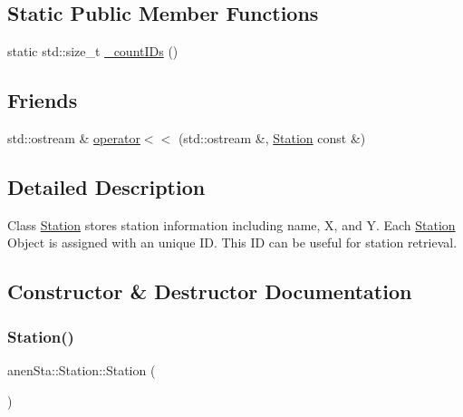 \subsection*{Static Public Member Functions}
\begin{DoxyCompactItemize}
\item 
static std\+::size\+\_\+t \mbox{\hyperlink{classanen_sta_1_1_station_a6623cdce8748308c6d0e27ab4a111eb7}{\+\_\+count\+I\+Ds}} ()
\end{DoxyCompactItemize}
\subsection*{Friends}
\begin{DoxyCompactItemize}
\item 
std\+::ostream \& \mbox{\hyperlink{classanen_sta_1_1_station_a98b2219804f7e593b080d3c8dec80f0b}{operator$<$$<$}} (std\+::ostream \&, \mbox{\hyperlink{classanen_sta_1_1_station}{Station}} const \&)
\end{DoxyCompactItemize}


\subsection{Detailed Description}
Class \mbox{\hyperlink{classanen_sta_1_1_station}{Station}} stores station information including name, X, and Y. Each \mbox{\hyperlink{classanen_sta_1_1_station}{Station}} Object is assigned with an unique ID. This ID can be useful for station retrieval. 

\subsection{Constructor \& Destructor Documentation}
\mbox{\label{classanen_sta_1_1_station_afb64bb9d68c519a693cd10af5d783873}} 
\subsubsection{\texorpdfstring{Station()}{Station()}\hspace{0.1cm}{\footnotesize\ttfamily [1/4]}}
{\footnotesize\ttfamily anen\+Sta\+::\+Station\+::\+Station (\begin{DoxyParamCaption}{ }\end{DoxyParamCaption})}

